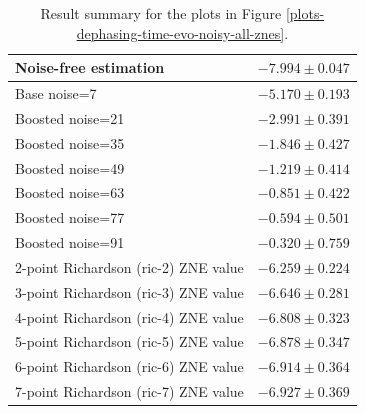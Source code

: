 \begin{table}
\caption{Result summary for the plots in Figure \ref{plots-dephasing-time-evo-noisy-all-znes}.}
\begin{tabular*}{\textwidth}{@{\extracolsep{\fill}}ll@{}}
\toprule

Noise-free estimation & $-7.994 \pm 0.047$ \\
\midrule
Base noise=7 & $-5.170 \pm 0.193$ \\
Boosted noise=21 & $-2.991 \pm 0.391$ \\
Boosted noise=35 & $-1.846 \pm 0.427$ \\
Boosted noise=49 & $-1.219 \pm 0.414$ \\
Boosted noise=63 & $-0.851 \pm 0.422$ \\
Boosted noise=77 & $-0.594 \pm 0.501$ \\
Boosted noise=91 & $-0.320 \pm 0.759$ \\
\midrule
2-point Richardson (ric-2) ZNE value & $-6.259 \pm 0.224$ \\
3-point Richardson (ric-3) ZNE value & $-6.646 \pm 0.281$ \\
4-point Richardson (ric-4) ZNE value & $-6.808 \pm 0.323$ \\
5-point Richardson (ric-5) ZNE value & $-6.878 \pm 0.347$ \\
6-point Richardson (ric-6) ZNE value & $-6.914 \pm 0.364$ \\
7-point Richardson (ric-7) ZNE value & $-6.927 \pm 0.369$ \\
\bottomrule
\end{tabular*}
\label{table-dephasing-noise-free-time-evo}
\end{table}
